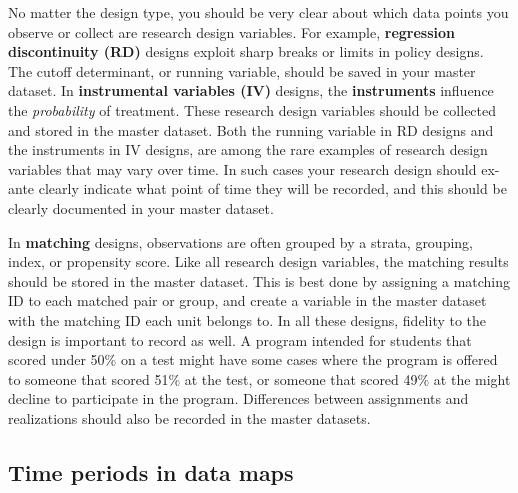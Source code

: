 No matter the design type, you should be very clear about
which data points you observe or collect are research design variables.
For example,
\textbf{regression discontinuity (RD)}
designs exploit sharp breaks or limits
in policy designs.
The cutoff determinant, or running variable,
should be saved in your master dataset.
In \textbf{instrumental variables (IV)}
designs, the \textbf{instruments} influence the \textit{probability} of treatment.
These research design variables should be collected
and stored in the master dataset.
Both the running variable in RD designs
and the instruments in IV designs,
are among the rare examples of research design variables
that may vary over time.
In such cases your research design should
ex-ante clearly indicate what point of time they will be recorded,
and this should be clearly documented in your master dataset.

In \textbf{matching} designs, observations are often grouped
by a strata, grouping, index, or propensity score.
Like all research design variables, the matching results
should be stored in the master dataset.
This is best done by assigning a matching ID
to each matched pair or group,
and create a variable in the master dataset
with the matching ID each unit belongs to.
In all these designs, fidelity to the design is important to record as well.
A program intended for students that scored under 50\% on a test
might have some cases where the program is offered to someone that scored 51\% at the test,
or someone that scored 49\% at the might decline to participate in the program.
Differences between assignments and realizations
should also be recorded in the master datasets.

\subsection{Time periods in data maps}

